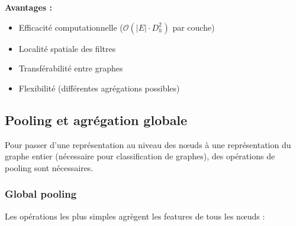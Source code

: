 \textbf{Avantages :}
\begin{itemize}
    \item Efficacité computationnelle ($\mathcal{O}(|E| \cdot D_h^2)$ par couche)
    \item Localité spatiale des filtres
    \item Transférabilité entre graphes
    \item Flexibilité (différentes agrégations possibles)
\end{itemize}

\subsection{Pooling et agrégation globale}

Pour passer d'une représentation au niveau des nœuds à une représentation du graphe entier (nécessaire pour classification de graphes), des opérations de pooling sont nécessaires.

\subsubsection{Global pooling}

Les opérations les plus simples agrègent les features de tous les nœuds :

